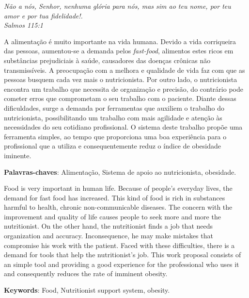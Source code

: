 \documentclass[
	12pt,				%
    oneside,			%
	a4paper,			%
	english,			%
	french,				%
	spanish,			%
	brazil,				%
	]{abntex2}
\begin{document}
\vspace*{\fill}
{ \raggedleft
	\textit{Não a nós, Senhor, nenhuma glória para nós, mas sim ao teu nome, por teu amor e por tua fidelidade!. \\
		Salmos 115:1}
	~
}
\pagebreak



\begin{resumo} %
 A alimentação é muito importante na vida humana. Devido a vida corriqueira das
pessoas, aumentou-se a demanda pelos \textit{fast-food}, alimentos estes ricos em
substâncias prejudiciais à saúde, causadores das doenças crônicas não transmissíveis. 
A preocupação com a melhora e qualidade de vida faz com que as pessoas busquem cada
vez mais o nutricionista. Por outro lado, o
nutricionista encontra um trabalho que necessita de organização e precisão, do
contrário pode cometer erros que comprometam o seu trabalho com o paciente. Diante
dessas dificuldades, surge a demanda por ferramentas que auxiliem o trabalho do
nutricionista, possibilitando um trabalho com mais agilidade e atenção às
necessidades do seu cotidiano profissional. O sistema deste trabalho propõe uma
ferramenta simples, ao tempo que proporciona uma boa
experiência para o profissional que a utiliza e consequentemente reduz o índice de
obesidade iminente.
 \vspace{\onelineskip}
    
 \noindent
 \textbf{Palavras-chaves}: Alimentação, Sistema de apoio ao
nutricionista, obesidade.
\end{resumo} %


\begin{resumo}[Abstract]
Food is very important in human life. Because of people's everyday lives, the demand for fast food has increased. This kind of food is rich in substances harmful to health, chronic non-communicable diseases. The concern with the improvement and quality of life causes people to seek more and more the nutritionist. On the other hand, the nutritionist finds a job that needs organization and accuracy. Inconsequence, he may make mistakes that compromise his work with the patient. Faced with these difficulties, there is a demand for tools that help the nutritionist's job. This work proposal consists of an simple tool and providing a good experience for the professional who uses it and consequently reduces the rate of imminent obesity.
\vspace{\onelineskip}

\noindent
\textbf{Keywords}: Food, Nutritionist support system, obesity.
\end{resumo}
\end{document}
